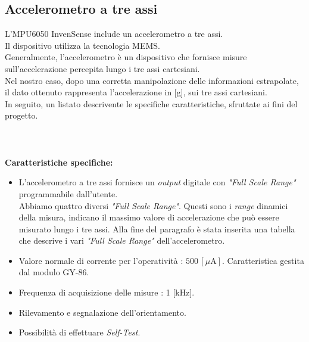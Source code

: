 \documentclass[11pt]{report}
\begin{document}
\subsection{Accelerometro a tre assi}
L'MPU6050 InvenSense include un accelerometro a tre assi.\\
Il dispositivo utilizza la tecnologia MEMS.\\
Generalmente, l'accelerometro è un dispositivo che fornisce misure sull'accelerazione percepita lungo i tre assi cartesiani.\\
Nel nostro caso, dopo una corretta manipolazione delle informazioni estrapolate, il dato ottenuto rappresenta l'accelerazione in [g], sui tre assi cartesiani.\\
In seguito, un listato descrivente le specifiche caratteristiche, sfruttate ai fini del progetto.\\\\\\\\
\textbf{Caratteristiche specifiche:}
\begin{itemize}
\item L'accelerometro a tre assi fornisce un \textit{output} digitale con \textit{"Full Scale Range"} programmabile dall'utente.\\ Abbiamo quattro diversi \textit{"Full Scale Range"}. Questi sono i \textit{range} dinamici della misura, indicano il massimo valore di accelerazione che può essere misurato lungo i tre assi. Alla fine del paragrafo è stata inserita una tabella che descrive i vari \textit{"Full Scale Range"} dell'accelerometro. 
\item Valore normale di corrente per l'operatività : $500\,[\mu\text{A}]$. Caratteristica gestita dal modulo GY-86.
\item Frequenza di acquisizione delle misure : 1 [kHz].
\item Rilevamento e segnalazione dell'orientamento.
\item Possibilità di effettuare \textit{Self-Test}.
\end{itemize}
\begin{table}[H]
    \centering
    \caption{Full Scale Range Accelerometro}
    \label{tab: tabella}
\end{table}
\end{document}
